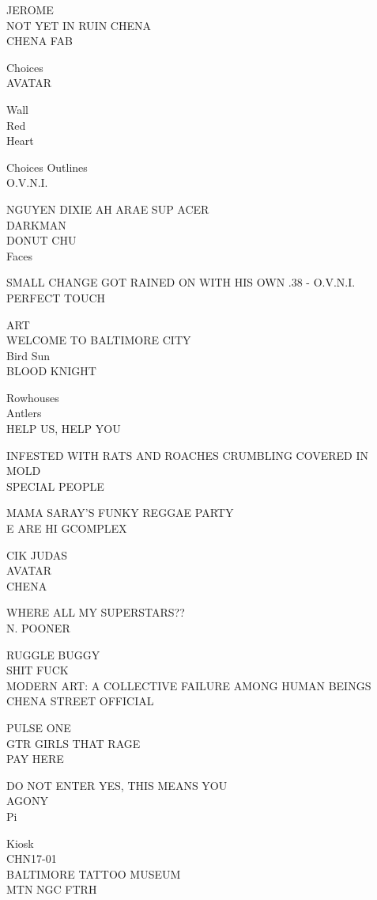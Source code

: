 \documentclass[10pt,letterpaper]{article}
\begin{document}
JEROME\\
NOT YET IN RUIN CHENA\\
CHENA FAB

Choices\\
AVATAR

Wall\\
Red\\
Heart

Choices Outlines\\
O.V.N.I.

NGUYEN DIXIE AH ARAE SUP ACER\\
DARKMAN\\
DONUT CHU\\
Faces

SMALL CHANGE GOT RAINED ON WITH HIS OWN .38 {-} O.V.N.I.\\
PERFECT TOUCH

ART\\
WELCOME TO BALTIMORE CITY\\
Bird Sun\\
BLOOD KNIGHT

Rowhouses\\
Antlers\\
HELP US, HELP YOU

INFESTED WITH RATS AND ROACHES CRUMBLING COVERED IN MOLD\\
SPECIAL PEOPLE

MAMA SARAY'S FUNKY REGGAE PARTY\\
E ARE HI GCOMPLEX

CIK JUDAS\\
AVATAR\\
CHENA

WHERE ALL MY SUPERSTARS??\\
N. POONER

RUGGLE BUGGY\\
SHIT FUCK\\
MODERN ART: A COLLECTIVE FAILURE AMONG HUMAN BEINGS\\
CHENA STREET OFFICIAL

PULSE ONE\\
GTR GIRLS THAT RAGE\\
PAY HERE

DO NOT ENTER YES, THIS MEANS YOU\\
AGONY\\
Pi

Kiosk\\
CHN17{-}01\\
BALTIMORE TATTOO MUSEUM\\
MTN NGC FTRH
\end{document}
